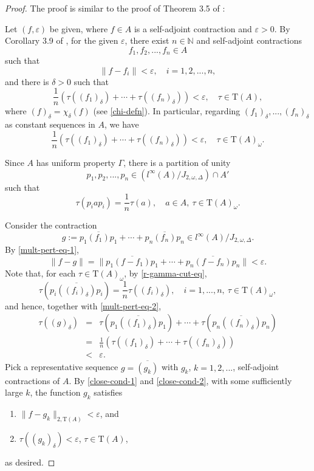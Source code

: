 \documentclass[12pt, oneside, psamsfonts]{amsart}
\theoremstyle{definition}
\theoremstyle{remark}
\numberwithin{equation}{section}
\newcommand{\norm}[1]{\| #1\|}
\newcommand{\eps}{\varepsilon}
\newcommand{\tr}{\mathrm{T}}
\begin{document}
\begin{proof}
The proof is similar to the proof of Theorem 3.5 of \cite{EN-SBP-I}:

Let $(f, \eps)$ be given, where $f \in A$ is a self-adjoint contraction and $\eps>0$. By Corollary 3.9 of \cite{EN-SBP-I}, 
for the given $\eps$, there exist $n\in\mathbb N$ and self-adjoint contractions $$f_1, f_2, ..., f_n \in A$$  such that
\begin{equation}\label{mult-pert-eq-1}
\norm{f - f_i} < \eps,\quad i=1, 2, ..., n, 
\end{equation}
and 
there is $\delta>0$ such that 
\begin{equation*}
\frac{1}{n}(\tau((f_1)_\delta) + \cdots + \tau((f_n)_\delta)) < \eps,\quad \tau\in\mathrm{T}(A),
\end{equation*} 
where $(f)_\delta = \chi_\delta(f)$ (see \eqref{chi-defn}). 
In particular, regarding $(f_1)_\delta, ..., (f_n)_\delta$ as constant sequences in $A$, we have
\begin{equation}\label{mult-pert-eq-2}
\frac{1}{n}(\tau((f_1)_\delta) + \cdots + \tau((f_n)_\delta)) < \eps,\quad \tau\in\tr(A)_\omega.
\end{equation} 

Since $A$ has uniform property $\Gamma$, there is a partition of unity $$p_1, p_2, ..., p_n \in ( l^\infty(A)/J_{2, \omega, \Delta}) \cap A' $$
such that
\begin{equation}\label{r-gamma-cut-eq}
\tau(p_iap_i) = \frac{1}{n} \tau(a),\quad a\in A,\ \tau\in \tr(A)_\omega.
\end{equation}

Consider the contraction $$g:=p_1\overline{(f_1)}p_1 + \cdots + p_n\overline{(f_n)}p_n \in l^\infty(A)/J_{2, \omega, \Delta}. $$
By \eqref{mult-pert-eq-1},
\begin{equation}\label{close-cond-1}
\norm{f-g} = \norm{p_1\overline{(f-f_1)}p_1 + \cdots + p_n\overline{(f-f_n)}p_n}  < \eps.
\end{equation}
Note that, for each $\tau \in \tr(A)_\omega$, by \eqref{r-gamma-cut-eq},
$$\tau(p_i\overline{((f_i)_\delta)} p_i) = \frac{1}{n}\tau((f_i)_\delta),\quad i=1, ..., n, \ \tau\in\tr(A)_\omega,$$
and hence, together with \eqref{mult-pert-eq-2},
\begin{eqnarray}\label{close-cond-2}
\tau((g)_\delta) & = & \tau(p_1\overline{((f_1)_\delta)}p_1) + \cdots + \tau(p_n\overline{((f_n)_\delta)}p_n) \\
& = & \frac{1}{n}(\tau((f_1)_\delta) + \cdots + \tau((f_n)_\delta)  ) \nonumber \\
& < & \eps.  \nonumber
\end{eqnarray}
Pick a representative sequence $g = \overline{(g_k)}$ with $g_k$, $k=1, 2, ...$, self-adjoint contractions of $A$. By \eqref{close-cond-1} and \eqref{close-cond-2}, with some sufficiently large $k$, the function $g_k$ satisfies
\begin{enumerate}
\item $\norm{f - g_k}_{2, \tr(A)} < \eps$, and
\item $\tau((g_k)_\delta) < \eps$, $\tau\in \tr(A)$,
\end{enumerate}
as desired.
\end{proof}
\end{document}
